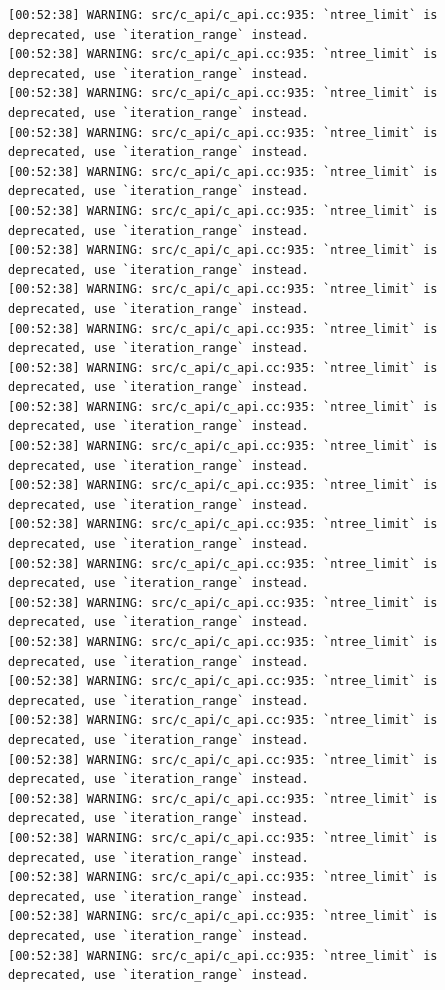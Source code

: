 \documentclass[
  letterpaper,
  DIV=11,
  numbers=noendperiod]{scrartcl}
\begin{document}
\begin{verbatim}
[00:52:38] WARNING: src/c_api/c_api.cc:935: `ntree_limit` is deprecated, use `iteration_range` instead.
[00:52:38] WARNING: src/c_api/c_api.cc:935: `ntree_limit` is deprecated, use `iteration_range` instead.
[00:52:38] WARNING: src/c_api/c_api.cc:935: `ntree_limit` is deprecated, use `iteration_range` instead.
[00:52:38] WARNING: src/c_api/c_api.cc:935: `ntree_limit` is deprecated, use `iteration_range` instead.
[00:52:38] WARNING: src/c_api/c_api.cc:935: `ntree_limit` is deprecated, use `iteration_range` instead.
[00:52:38] WARNING: src/c_api/c_api.cc:935: `ntree_limit` is deprecated, use `iteration_range` instead.
[00:52:38] WARNING: src/c_api/c_api.cc:935: `ntree_limit` is deprecated, use `iteration_range` instead.
[00:52:38] WARNING: src/c_api/c_api.cc:935: `ntree_limit` is deprecated, use `iteration_range` instead.
[00:52:38] WARNING: src/c_api/c_api.cc:935: `ntree_limit` is deprecated, use `iteration_range` instead.
[00:52:38] WARNING: src/c_api/c_api.cc:935: `ntree_limit` is deprecated, use `iteration_range` instead.
[00:52:38] WARNING: src/c_api/c_api.cc:935: `ntree_limit` is deprecated, use `iteration_range` instead.
[00:52:38] WARNING: src/c_api/c_api.cc:935: `ntree_limit` is deprecated, use `iteration_range` instead.
[00:52:38] WARNING: src/c_api/c_api.cc:935: `ntree_limit` is deprecated, use `iteration_range` instead.
[00:52:38] WARNING: src/c_api/c_api.cc:935: `ntree_limit` is deprecated, use `iteration_range` instead.
[00:52:38] WARNING: src/c_api/c_api.cc:935: `ntree_limit` is deprecated, use `iteration_range` instead.
[00:52:38] WARNING: src/c_api/c_api.cc:935: `ntree_limit` is deprecated, use `iteration_range` instead.
[00:52:38] WARNING: src/c_api/c_api.cc:935: `ntree_limit` is deprecated, use `iteration_range` instead.
[00:52:38] WARNING: src/c_api/c_api.cc:935: `ntree_limit` is deprecated, use `iteration_range` instead.
[00:52:38] WARNING: src/c_api/c_api.cc:935: `ntree_limit` is deprecated, use `iteration_range` instead.
[00:52:38] WARNING: src/c_api/c_api.cc:935: `ntree_limit` is deprecated, use `iteration_range` instead.
[00:52:38] WARNING: src/c_api/c_api.cc:935: `ntree_limit` is deprecated, use `iteration_range` instead.
[00:52:38] WARNING: src/c_api/c_api.cc:935: `ntree_limit` is deprecated, use `iteration_range` instead.
[00:52:38] WARNING: src/c_api/c_api.cc:935: `ntree_limit` is deprecated, use `iteration_range` instead.
[00:52:38] WARNING: src/c_api/c_api.cc:935: `ntree_limit` is deprecated, use `iteration_range` instead.
[00:52:38] WARNING: src/c_api/c_api.cc:935: `ntree_limit` is deprecated, use `iteration_range` instead.

\end{verbatim}
\end{document}
